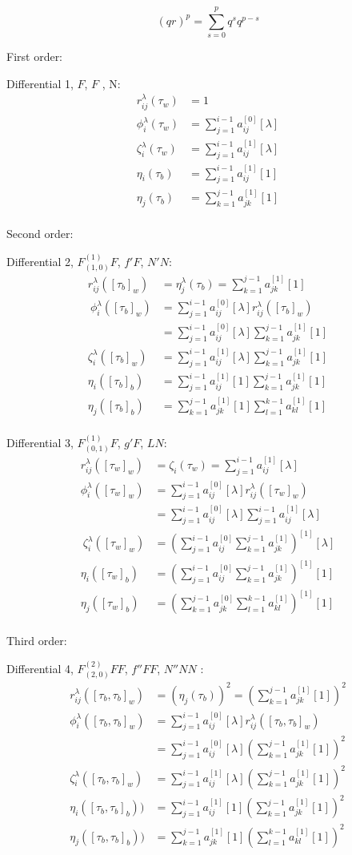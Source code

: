 \documentclass[english,unicode]{article}
\def\SiL{\sum_{j=1}^{i-1}a_{ij}^{[0]}[\lambda]}
\def\SiIL{\sum_{j=1}^{i-1}a_{ij}^{[1]}[\lambda]}
\def\Si{\sum_{j=1}^{i-1}a_{ij}^{[0]}}
\def\Sj{\sum_{k=1}^{j-1}a_{jk}^{[0]}}
\def\SjI{\sum_{k=1}^{j-1}a_{jk}^{[1]}}
\def\SkI{\sum_{l=1}^{k-1}a_{kl}^{[1]}}
\def\SiIO{\sum_{j=1}^{i-1}a_{ij}^{[1]}[1]}
\def\SjIO{\sum_{k=1}^{j-1}a_{jk}^{[1]}[1]}
\def\SkIO{\sum_{l=1}^{k-1}a_{kl}^{[1]}[1]}
\def\EIL{^{[1]}[\lambda]}
\def\EIO{^{[1]}[1]}
\begin{document}
$$
(qr)^p=\sum_{s=0}^{p}q^{s}q^{p-s}
$$

First order:

Differential 1, $F$,  $F$ , N:
\begin{align*}
r_{ij}^\lambda(\tau_w) &=1\\
\phi_i^\lambda(\tau_w) & = \SiL\\
\zeta_i^\lambda(\tau_w) & = \SiIL\\
\eta_i(\tau_b) & = \SiIO\\
\eta_j(\tau_b) & =\SjIO\\
\end{align*}

\newpage
Second order:

Differential 2, $F^{(1)}_{(1,0)}F$, $f'F$, $N'N$:
\begin{align*}
r_{ij}^\lambda([\tau_b]_w) &=\eta_j^\lambda (\tau_b)=\SjIO\\\
\phi_i^\lambda([\tau_b]_w) & = \SiL r_{ij}^\lambda ([\tau_b]_w)\\
& = \SiL \SjIO \\
\zeta_i^\lambda([\tau_b]_w) &=\SiIL \SjIO \\
\eta_i([\tau_b]_b) &=\SiIO \SjIO\\
\eta_j([\tau_b]_b) &=\SjIO \SkIO\\
\end{align*}

Differential 3, $F^{(1)}_{(0,1)}F$, $g'F$, $LN$:
\begin{align*}
r_{ij}^\lambda([\tau_w]_w) &=\zeta_i(\tau_w)=\SiIL \\
\phi_i^\lambda([\tau_w]_w) &= \SiL r_{ij}^\lambda ([\tau_w]_w)\\
& = \SiL \SiIL\\\
\zeta_i^\lambda([\tau_w]_w) &= (\Si \SjI )\EIL \\
\eta_i([\tau_w]_b) &=(\Si \SjI )\EIO \\
\eta_j([\tau_w]_b) &=(\Sj \SkI)\EIO \\
\end{align*}

\newpage
Third order:

Differential 4, $F^{(2)}_{(2,0)}FF$, $f''FF$, $N''NN$ :
\begin{align*}
r_{ij}^\lambda([\tau_b,\tau_b]_w) & = (\eta_j(\tau_b))^2=( \SjIO)^2\\
\phi_i^\lambda([\tau_b,\tau_b]_w) &= \SiL r_{ij}^\lambda ([\tau_b,\tau_b]_w)\\
& = \SiL( \SjIO)^2\\
\zeta_i^\lambda([\tau_b,\tau_b]_w) &= \SiIL ( \SjIO)^2\\
\eta_i([\tau_b,\tau_b]_b)) &=\SiIO ( \SjIO)^2\\
\eta_j([\tau_b,\tau_b]_b)) &=\SjIO ( \SkIO)^2\\
\end{align*}
\end{document}

